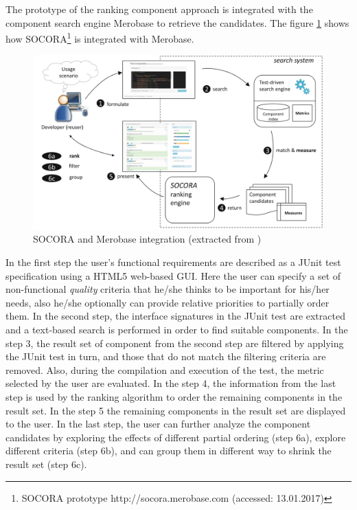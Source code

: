 The prototype of the ranking component approach is integrated with the component search engine Merobase to retrieve the candidates. The figure \ref{fig:socora-merobase} shows how SOCORA\footnote{SOCORA prototype http://socora.merobase.com (accessed: 13.01.2017)} is integrated with Merobase. 

\begin{figure}[ht]
	\centering
    \includegraphics[width=\textwidth]{grafiken/socora-merobase}
    \caption{SOCORA and Merobase integration (extracted from \citep{Kessel2016})}
    \label{fig:socora-merobase}
\end{figure}

In the first step the user's functional requirements are described as a JUnit test specification using a HTML5 web-based GUI. Here the user can specify a set of non-functional \textit{quality} criteria that he/she thinks to be important for his/her needs, also he/she optionally can provide relative priorities to partially order them. In the second step, the interface signatures in the JUnit test are extracted and a text-based search is performed in order to find suitable components. In the step 3, the result set of component from the second step are filtered by applying the JUnit test in turn, and those that do not match the filtering criteria are removed. Also, during the compilation and execution of the test, the metric selected by the user are evaluated. In the step 4, the information from the last step is used by the ranking algorithm to order the remaining components in the result set. In the step 5 the remaining components in the result set are displayed to the user. In the last step, the user can further analyze the component candidates by exploring the effects of different partial ordering (step 6a), explore different criteria (step 6b), and can group them in different way to shrink the result set (step 6c).

 

